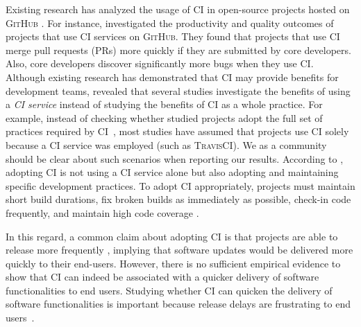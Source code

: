 Existing research has analyzed the usage of CI in open-source projects hosted on \textsc{GitHub} \citep{Vasilescu2015-tj,Vasilescu2015-tn,Hilton2016-xy,bernardo2018studying,nery2019empirical,soares2022effects,santos2022investigating}. For instance, \citet{Vasilescu2015-tn} investigated the productivity and quality outcomes of projects that use CI services on \textsc{GitHub}. They found that projects that use CI merge pull requests (PRs) more quickly if they are submitted by core developers. Also, core developers discover significantly more bugs when they use CI. 
Although existing research has demonstrated that CI may provide benefits for development teams, \citet{soares2022effects} revealed that several studies investigate the benefits of using a {\em CI service} instead of studying the benefits of CI as a whole practice. For example, instead of checking whether studied projects adopt the full set of practices required by CI~\citep{felidre2019continuous}, most studies have assumed that projects use CI solely because a CI service was employed (such as \textsc{TravisCI}). We as a community should be clear about such scenarios when reporting our results. According to \cite{Fowler2006-zc}, adopting CI is not using a CI service alone but also adopting and maintaining specific development practices. 
To adopt CI appropriately, projects must maintain short build durations, fix broken builds as immediately as possible, check-in code frequently, and maintain high code coverage \citep{Duvall2007-tb,felidre2019continuous,santos2022investigating}.

In this regard, a common claim about adopting CI is that projects are able to release more frequently \citep{Stahl:2014:MCI:2562355.2562828,Hilton2016-xy}, implying that software updates would be delivered more quickly to their end-users. However, there is no sufficient empirical evidence to show that CI can indeed be associated with a quicker delivery of software functionalities to end users. Studying whether CI can quicken the delivery of software functionalities is important because release delays are frustrating to end users~\citep{costa2014empirical,Da_Costa2016-cb}.

